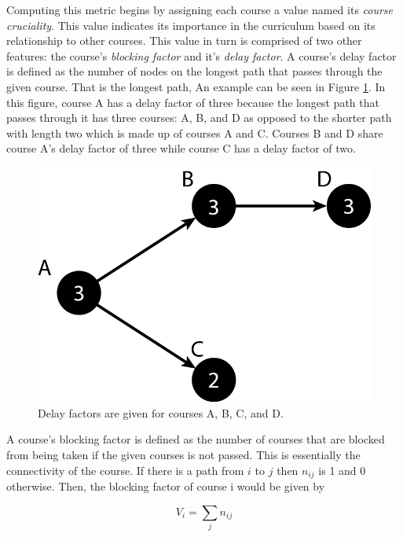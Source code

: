 \documentclass[botnum, fleqn]{unmeethesis}
\begin{document}
Computing this metric begins by assigning each course a value named its \textit{course cruciality}. This value indicates its importance in the curriculum based on its relationship to other courses. This value in turn is comprised of two other features: the course's \textit{blocking factor} and it's \textit{delay factor}. A course's delay factor is defined as the number of nodes on the longest path that passes through the given course. That is the longest path, An example can be seen in Figure \ref{fig:delay_factor_example}. In this figure, course A has a delay factor of three because the longest path that passes through it has three courses: A, B, and D as opposed to the shorter path with length two which is made up of courses A and C. Courses B and D share course A's delay factor of three while course C has a delay factor of two.

\begin{figure}[h!]
\centerline{\includegraphics[scale=0.4]{./figures/delay_factor.png}}
\caption{Delay factors are given for courses A, B, C, and D.} 
\label{fig:delay_factor_example}
\end{figure}

A course's blocking factor is defined as the number of courses that are blocked from being taken if the given courses is not passed. This is essentially the connectivity of the course. If there is a path from \(i\) to \(j\) then \(n_{ij}\) is 1 and 0 otherwise. Then, the blocking factor of course i would be given by

\begin{equation}
  V_{i} = \sum_{j} n_{ij}
\end{equation}
\end{document}
